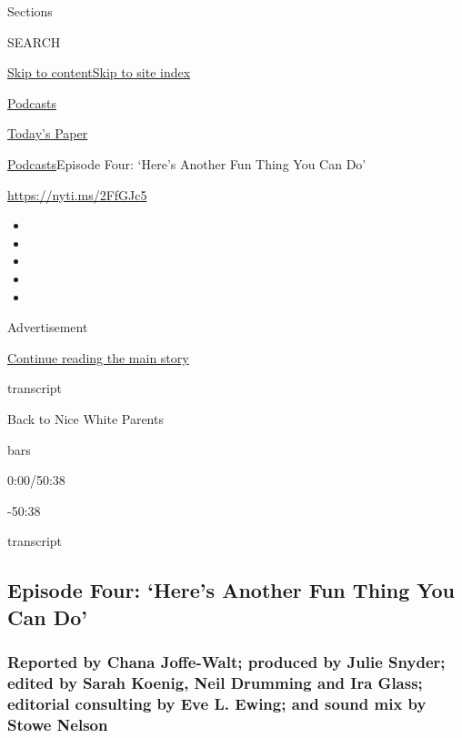 Sections

SEARCH

\protect\hyperlink{site-content}{Skip to
content}\protect\hyperlink{site-index}{Skip to site index}

\href{https://www.nytimes.com/spotlight/podcasts}{Podcasts}

\href{https://myaccount.nytimes.com/auth/login?response_type=cookie\&client_id=vi}{}

\href{https://www.nytimes.com/section/todayspaper}{Today's Paper}

\href{/spotlight/podcasts}{Podcasts}\textbar{}Episode Four: `Here's
Another Fun Thing You Can Do'

\url{https://nyti.ms/2FfGJc5}

\begin{itemize}
\item
\item
\item
\item
\item
\end{itemize}

Advertisement

\protect\hyperlink{after-top}{Continue reading the main story}

transcript

Back to Nice White Parents

bars

0:00/50:38

-50:38

transcript

\hypertarget{episode-four-heres-another-fun-thing-you-can-do}{%
\subsection{Episode Four: `Here's Another Fun Thing You Can
Do'}\label{episode-four-heres-another-fun-thing-you-can-do}}

\hypertarget{reported-by-chana-joffe-walt-produced-by-julie-snyder-edited-by-sarah-koenig-neil-drumming-and-ira-glass-editorial-consulting-by-eve-l-ewing-and-sound-mix-by-stowe-nelson}{%
\subsubsection{Reported by Chana Joffe-Walt; produced by Julie Snyder;
edited by Sarah Koenig, Neil Drumming and Ira Glass; editorial
consulting by Eve L. Ewing; and sound mix by Stowe
Nelson}\label{reported-by-chana-joffe-walt-produced-by-julie-snyder-edited-by-sarah-koenig-neil-drumming-and-ira-glass-editorial-consulting-by-eve-l-ewing-and-sound-mix-by-stowe-nelson}}

